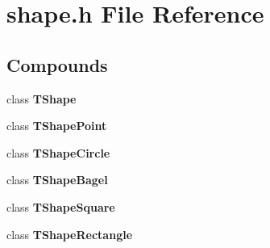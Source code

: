 \section{shape.h File Reference}
\label{shape.h}


\subsection*{Compounds}
\begin{CompactItemize}
\item 
class {\bf TShape}
\item 
class {\bf TShape\-Point}
\item 
class {\bf TShape\-Circle}
\item 
class {\bf TShape\-Bagel}
\item 
class {\bf TShape\-Square}
\item 
class {\bf TShape\-Rectangle}
\end{CompactItemize}
